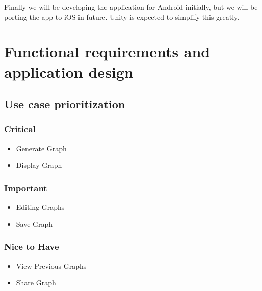 \documentclass[a4paper,12pt]{article}
\begin{document}
Finally we will be developing the application for Android initially, but we will be porting the app to iOS in future. Unity is expected to simplify this greatly.
\newpage
\section{Functional requirements and application design}

\subsection{Use case prioritization}
	\subsubsection{Critical}
		\begin{itemize}
			\item Generate Graph
			\item Display Graph
		\end{itemize}
	\subsubsection{Important}
		\begin{itemize}
			\item Editing Graphs
			\item Save Graph
		\end{itemize}
	\subsubsection{Nice to Have}
		\begin{itemize}
			\item View Previous Graphs
			\item Share Graph
		\end{itemize}
\end{document}
